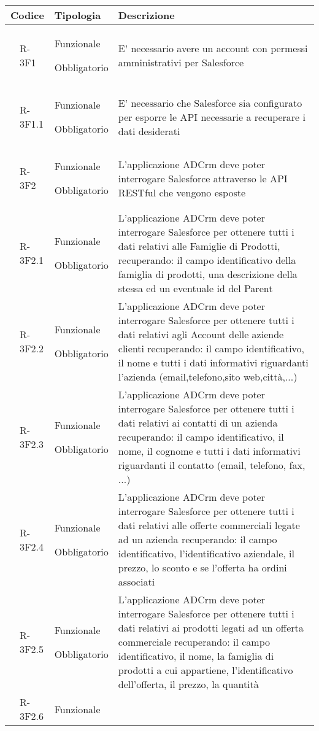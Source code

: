 \begin{longtable}{|r l|p{2.5cm}|p{10cm}|}
	\hline
	\multicolumn{2}{|c|}{\textbf{Codice}} & \textbf{Tipologia} & \textbf{Descrizione}\tabularnewline
	\hline
	& \hypertarget{R-3F1}{R-3F1} & Funzionale
	
	Obbligatorio & E' necessario avere un account con permessi amministrativi per Salesforce\tabularnewline
	\hline
	 & R-3F1.1 & Funzionale
	
	Obbligatorio & E' necessario che Salesforce sia configurato per esporre le API necessarie a recuperare i dati desiderati\tabularnewline
	\hline
	& \hypertarget{R-3F2}{R-3F2} & Funzionale
	
	Obbligatorio & L'applicazione ADCrm deve poter interrogare Salesforce attraverso le API RESTful che vengono esposte
	\tabularnewline
	\hline
	& R-3F2.1 & Funzionale
	
	Obbligatorio & L'applicazione ADCrm deve poter interrogare Salesforce per ottenere tutti i dati relativi alle Famiglie di Prodotti, recuperando: il campo identificativo della famiglia di prodotti, una descrizione della stessa ed un eventuale id del Parent\tabularnewline
	\hline
	 & R-3F2.2 & Funzionale
	
	Obbligatorio & L'applicazione ADCrm deve poter interrogare Salesforce per ottenere tutti i dati relativi agli Account delle aziende clienti recuperando: il campo identificativo, il nome e tutti i dati informativi riguardanti l'azienda (email,telefono,sito web,città,...)\tabularnewline
	\hline
	& R-3F2.3 & Funzionale
	
	Obbligatorio & L'applicazione ADCrm deve poter interrogare Salesforce per ottenere tutti i dati relativi ai contatti di un azienda recuperando: il campo identificativo, il nome, il cognome e tutti i dati informativi riguardanti il contatto (email, telefono, fax, ...)\tabularnewline
	\hline
	& R-3F2.4 & Funzionale
	
	Obbligatorio & L'applicazione ADCrm deve poter interrogare Salesforce per ottenere tutti i dati relativi alle offerte commerciali legate ad un azienda recuperando: il campo identificativo, l'identificativo aziendale, il prezzo, lo sconto e se l'offerta ha ordini associati \tabularnewline
	\hline
	& R-3F2.5 & Funzionale
	
	Obbligatorio & L'applicazione ADCrm deve poter interrogare Salesforce per ottenere tutti i dati relativi ai prodotti legati ad un offerta commerciale recuperando: il campo identificativo, il nome, la famiglia di prodotti a cui appartiene, l'identificativo dell'offerta, il prezzo, la quantità\tabularnewline
	\hline
	& R-3F2.6 & Funzionale
	

\end{longtable}
